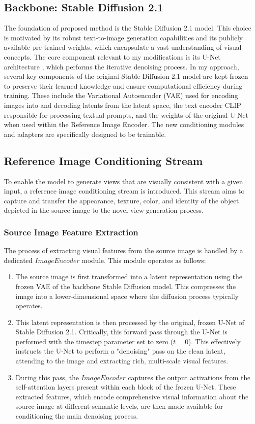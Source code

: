 \subsection{Backbone: Stable Diffusion 2.1}
The foundation of proposed method is the Stable Diffusion 2.1 model. This choice is motivated by its robust text-to-image generation capabilities and its publicly available pre-trained weights, which encapsulate a vast understanding of visual concepts. The core component relevant to my modifications is its U-Net architecture \cite{unet}, which performs the iterative denoising process.
In my approach, several key components of the original Stable Diffusion 2.1 model are kept frozen to preserve their learned knowledge and ensure computational efficiency during training. These include the Variational Autoencoder (VAE) \cite{vae} used for encoding images into and decoding latents from the latent space, the text encoder CLIP \cite{clip} responsible for processing textual prompts, and the weights of the original U-Net when used within the Reference Image Encoder. The new conditioning modules and adapters are specifically designed to be trainable.

\subsection{Reference Image Conditioning Stream}
To enable the model to generate views that are visually consistent with a given input, a reference image conditioning stream is introduced. This stream aims to capture and transfer the appearance, texture, color, and identity of the object depicted in the source image to the novel view generation process.

\subsubsection{Source Image Feature Extraction}
The process of extracting visual features from the source image is handled by a dedicated $ImageEncoder$ module. This module operates as follows:
\begin{enumerate}
  \item The source image is first transformed into a latent representation using the frozen VAE of the backbone Stable Diffusion model. This compresses the image into a lower-dimensional space where the diffusion process typically operates.
  \item This latent representation is then processed by the original, frozen U-Net of Stable Diffusion 2.1. Critically, this forward pass through the U-Net is performed with the timestep parameter set to zero ($t=0$). This effectively instructs the U-Net to perform a "denoising" pass on the clean latent, attending to the image and extracting rich, multi-scale visual features.
  \item During this pass, the $ImageEncoder$ captures the output activations from the self-attention layers present within each block of the frozen U-Net. These extracted features, which encode comprehensive visual information about the source image at different semantic levels, are then made available for conditioning the main denoising process.
\end{enumerate}

